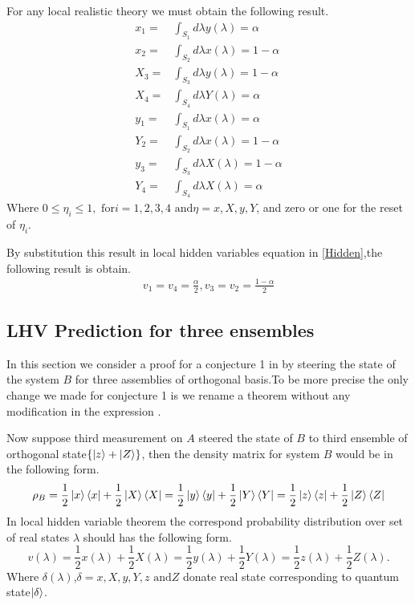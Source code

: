For any local realistic theory we must obtain the following result.
\begin{align*}
x_1=&\int_{S_1} d\lambda y(\lambda)=\alpha\\
x_2=&\int_{S_2} d\lambda x(\lambda)=1-\alpha\\
X_3=&\int_{S_3} d\lambda y(\lambda)=1-\alpha\\
X_4=&\int_{S_4} d\lambda Y(\lambda)=\alpha\\
y_1=&\int_{S_1} d\lambda x(\lambda)=\alpha\\
Y_2=&\int_{S_2} d\lambda x(\lambda)=1-\alpha\\
y_3=&\int_{S_3} d\lambda X(\lambda)=1-\alpha\\
Y_4=&\int_{S_4} d\lambda X(\lambda)=\alpha
\end{align*}
Where $0\leq \eta_i\leq 1, \text{ for} i=1,2,3,4 \text{ and} \eta= x,X,y,Y$, and zero or one for the reset of $\eta_i$.

 By substitution this result in local hidden variables equation in \ref{Hidden},the following result is obtain.
\begin{align*}
v_1=v_4=\frac{\alpha}{2}, v_3=v_2=\frac{1-\alpha}{2}
\end{align*}






\subsection{LHV Prediction for three ensembles}\hfill \break
In this section we consider a proof for a conjecture 1  in\citep{Jevtic:2015:10.1364/JOSAB.32.000A50} by steering the state of the system $B$ for three assemblies of orthogonal basis.To be more precise the only change we made for  conjecture 1 is we rename a theorem without any modification in the expression  \citep{Jevtic:2015:10.1364/JOSAB.32.000A50}.



Now suppose third measurement on $A$  steered the state of $B$ to third ensemble of orthogonal state$\{\ket{z}+\ket{Z}\}$, then the density matrix for system $B$ would be in the following form.
\begin{equation}
\rho_B=\frac{1}{2}\ket{x}\bra{x}+\frac{1}{2}\ket{X}\bra{X}=\frac{1}{2}\ket{y}\bra{y}+\frac{1}{2}\ket{Y}\bra{Y}=\frac{1}{2}\ket{z}\bra{z}+\frac{1}{2}\ket{Z}\bra{Z}
\end{equation}
In local hidden variable theorem the correspond probability distribution over set of real states $\lambda$ should has the following form.
\begin{equation}
v(\lambda)=\frac{1}{2} x(\lambda)+\frac{1}{2} X(\lambda)=\frac{1}{2} y(\lambda)+\frac{1}{2}Y(\lambda)=\frac{1}{2}z(\lambda)+\frac{1}{2}Z(\lambda).
\end{equation}
Where $\delta(\lambda)$,$\delta=x,X,y,Y,z \text{ and} Z$ donate real state corresponding to quantum state$\ket{\delta}$.

